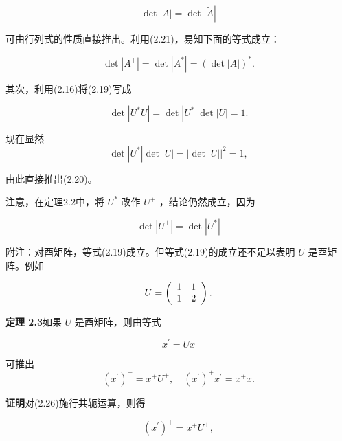 \begin{equation*}
\det | A | = \det | \widetilde {A} |\tag{2.21}
\end{equation*}

可由行列式的性质直接推出。利用(2.21)，易知下面的等式成立：

\begin{equation*}
\det | A ^ {+} | = \det | A ^ {*} | = (\det | A |) ^ {*}.\tag{2.22}
\end{equation*}

其次，利用(2.16)将(2.19)写成

\begin{equation*}
\det | U ^ {*} U | = \det | U ^ {*} | \det | U | = 1.\tag{2.23}
\end{equation*}

现在显然
\begin{equation*}
\det | U ^ {*} | \det | U | = | \det | U | | ^ {2} = 1,\tag{2.24}
\end{equation*}

由此直接推出(2.20)。

注意，在定理2.2中，将 $U^{*}$ 改作 $U^{+}$ ，结论仍然成立，因为

\begin{equation*}
\det | U ^ {+} | = \det | U ^ {*} |\tag{2.25}
\end{equation*}

附注：对酉矩阵，等式(2.19)成立。但等式(2.19)的成立还不足以表明 $U$ 是酉矩阵。例如

\begin{equation*}
U = \left( \begin{array}{c c} 1 & 1 \\ 1 & 2 \end{array} \right).
\end{equation*}

\textbf{定理 2.3}\quad 如果 $U$ 是酉矩阵，则由等式

\begin{equation*}
x ^ {\prime} = U x\tag{2.26}
\end{equation*}

可推出
\begin{equation*}
\left(x ^ {\prime}\right) ^ {+} = x ^ {+} U ^ {+}, \quad \left(x ^ {\prime}\right) ^ {+} x ^ {\prime} = x ^ {+} x.\tag{2.27}
\end{equation*}

\textbf{证明}\quad 对(2.26)施行共轭运算，则得

\begin{equation*}
(x ^ {\prime}) ^ {+} = x ^ {+} U ^ {+},\tag{2.28}
\end{equation*}

